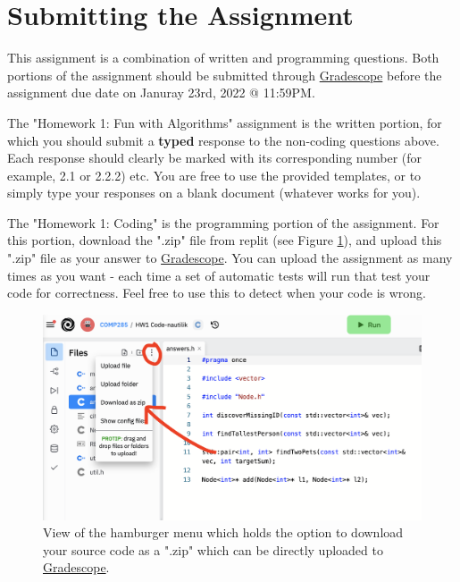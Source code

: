 \documentclass [12pt]{article}
\begin{document}


\pagebreak
\section*{Submitting the Assignment}

This assignment is a combination of written and programming questions. Both portions of the assignment should be submitted through \href{https://www.gradescope.com/courses/350304}{Gradescope} before the assignment due date on Januray 23rd, 2022 @ 11:59PM. 

The "Homework 1: Fun with Algorithms" assignment is the written portion, for which you should submit a \textbf{typed} response to the non-coding questions above. Each response should clearly be marked with its corresponding number (for example, 2.1 or 2.2.2) etc. You are free to use the provided templates, or to simply type your responses on a blank document (whatever works for you).

The "Homework 1: Coding" is the programming portion of the assignment. For this portion, download the ".zip" file from replit (see Figure \ref{fig:replit_download}), and upload this ".zip" file as your answer to \href{https://www.gradescope.com/courses/350304}{Gradescope}. You can upload the assignment as many times as you want - each time a set of automatic tests will run that test your code for correctness. Feel free to use this to detect when your code is wrong.

\begin{figure}[h!]
\centering
\includegraphics[scale=0.5]{replit-download.png}
\caption{View of the hamburger menu which holds the option to download your source code as a ".zip" which can be directly uploaded to \href{https://www.gradescope.com/courses/350304}{Gradescope}.}
\label{fig:replit_download}
\end{figure}
\end{document}
